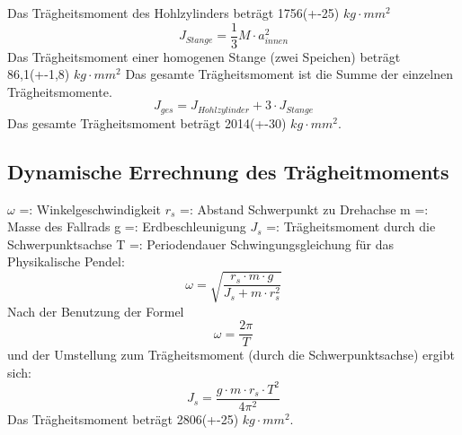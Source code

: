Das Trägheitsmoment des Hohlzylinders beträgt 1756(+-25) $kg\cdot mm^{2}$
\begin{equation}
J_{Stange} = \frac{1}{3}M\cdot a_{innen}^{2}
\end{equation}
Das Trägheitsmoment einer homogenen Stange (zwei Speichen) beträgt 86,1(+-1,8) $kg\cdot mm^{2}$
\newline
Das gesamte Trägheitsmoment ist die Summe der einzelnen Trägheitsmomente.
\begin{equation}
J_{ges} = J_{Hohlzylinder}+3\cdot J_{Stange}
\end{equation}
Das gesamte Trägheitsmoment beträgt  2014(+-30) $kg\cdot mm^{2}$.







\subsection{Dynamische Errechnung des Trägheitmoments}

$\omega$ =: Winkelgeschwindigkeit
\newline
$r_{s}$ =: Abstand Schwerpunkt zu Drehachse
\newline
m =: Masse des Fallrads
\newline
g =: Erdbeschleunigung
\newline
$J_{s}$ =: Trägheitsmoment durch die Schwerpunktsachse
\newline
T =: Periodendauer
\newline
\newline
Schwingungsgleichung für das Physikalische Pendel:
\begin{equation}
\omega = \sqrt{\frac{r_{s}\cdot m\cdot g}{J_{s}+m\cdot r_{s}^{2}}}
\end{equation}
Nach der Benutzung der Formel
\begin{equation}
\omega = \frac{2\pi}{T}
\end{equation}
und der Umstellung zum Trägheitsmoment (durch die Schwerpunktsachse) ergibt sich:
\begin{equation}
J_{s} = \frac{g\cdot m\cdot r_{s} \cdot T^{2}}{4\pi^{2}}
\end{equation}
Das Trägheitsmoment beträgt 2806(+-25) $kg\cdot mm^{2}$.
